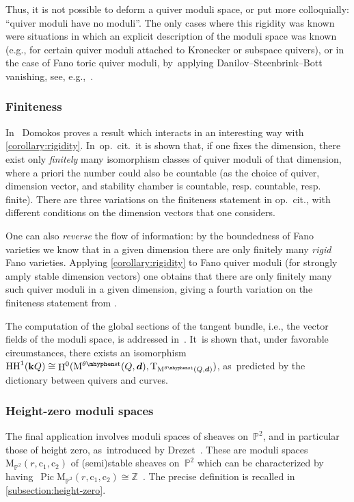 \documentclass[11pt]{article}
\newcommand{\resp}{resp.\xspace}
\theoremstyle{plain}
\theoremstyle{definition}
\DeclareMathOperator\HH{H}
\DeclareMathOperator\hochschild{HH}
\DeclareMathOperator\Pic{Pic}
\newcommand\field{\mathbf{k}}
\newcommand\moduli{\ensuremath{\mathrm{M}}}
\newcommand\stable{\ensuremath{\mhyphen\mathrm{st}}}
\newcommand\tangent{\ensuremath{\mathrm{T}}}
\newcommand\tuple[1]{\ensuremath{{\boldsymbol{#1}}}}
\begin{document}
Thus, it is not possible to deform a quiver moduli space,
or put more colloquially: ``quiver moduli have no moduli''.
The only cases where this rigidity was known
were situations in which an explicit description of the moduli space was known
(e.g., for certain quiver moduli attached to Kronecker or subspace quivers),
or in the case of Fano toric quiver moduli, by~applying Danilov–Steenbrink–Bott vanishing,
see, e.g.,~\cite[Th.\,2.4(i)]{MR1916637}.

\subsubsection*{Finiteness}
In~\cite{2303.08522v2} Domokos proves a result which interacts
in an interesting way with \cref{corollary:rigidity}. In~op.~cit.~it is shown that,
if one fixes the dimension,
there exist only \emph{finitely} many isomorphism classes of quiver moduli of that dimension,
where a priori the number could also be countable
(as the choice of quiver, dimension vector, and stability chamber is
countable, \resp countable, \resp finite).
There are three variations on the finiteness statement in op.~cit.,
with different conditions on the dimension vectors that one considers.

One can also \emph{reverse} the flow of information:
by the boundedness of Fano varieties \cite[Th.\,0.2]{MR1189503}
we know that in a given dimension there are only finitely many \emph{rigid} Fano varieties.
Applying \cref{corollary:rigidity} to Fano quiver moduli (for strongly amply stable dimension vectors)
one obtains that there are only finitely many such quiver moduli in a given dimension,
giving a fourth variation on the finiteness statement from \cite{2303.08522v2}.

\smallskip

The computation of the global sections of the tangent bundle,
i.e., the vector fields of the moduli space,
is addressed in~\cite{MR4883104}. It~is shown that,
under favorable circumstances,
there exists an isomorphism~$\hochschild^1(\field Q)\cong\HH^0(\modulispace[\theta\stable]{Q,\tuple{d}},\tangent_{\modulispace[\theta\stable]{Q,\tuple{d}}})$, as~predicted by the dictionary between quivers and curves.

\subsubsection*{Height-zero moduli spaces}
The final application involves moduli spaces of sheaves on~$\mathbb{P}^2$,
and in particular those of height zero, as~introduced by Drezet~\cite{MR0916199,MR0944602,MR0915184}.
These are moduli spaces~$\moduli_{\mathbb{P}^2}(r,\mathrm{c}_1,\mathrm{c}_2)$
of (semi)stable sheaves on~$\mathbb{P}^2$
which can be characterized by having~$\Pic\moduli_{\mathbb{P}^2}(r,\mathrm{c}_1,\mathrm{c}_2)\cong\mathbb{Z}$~\cite[Th.\,2]{MR0915184}.
The precise definition is recalled in \cref{subsection:height-zero}.
\end{document}
